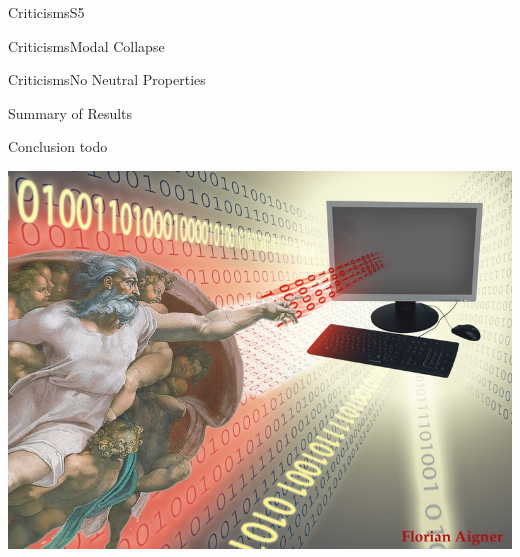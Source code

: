 
\begin{frame}{Criticisms}{S5}

\end{frame}


\begin{frame}{Criticisms}{Modal Collapse}

\end{frame}


\begin{frame}{Criticisms}{No Neutral Properties}

\end{frame}




\begin{frame}{Summary of Results}


\end{frame}


\begin{frame}{Conclusion} \small
todo
\end{frame}

\begin{frame}[plain]
\includegraphics[width=\textwidth]{TUWien-GodComputerC} 
\end{frame}
